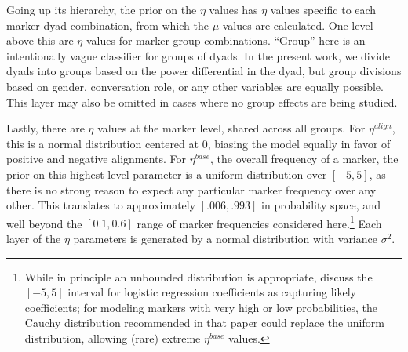 \documentclass{acm_proc_article-sp}
\begin{document}
Going up its hierarchy, the prior on the $\eta$ values has $\eta$ values specific to each marker-dyad combination, from which the $\mu$ values are calculated. One level above this are $\eta$ values for marker-group combinations. ``Group'' here is an intentionally vague classifier for groups of dyads.  In the present work, we divide dyads into groups based on the power differential in the dyad, but group divisions based on gender, conversation role, or any other variables are equally possible. This layer may also be omitted in cases where no group effects are being studied.

Lastly, there are $\eta$ values at the marker level, shared across all groups.  For $\eta^{align}$, this is a normal distribution centered at 0, biasing the model equally in favor of positive and negative alignments. For $\eta^{base}$, the overall frequency of a marker, the prior on this highest level parameter is a uniform distribution over $[-5,5]$, as there is no strong reason to expect any particular marker frequency over any other.  This translates to approximately $[.006,.993]$ in probability space, and well beyond the $[0.1,0.6]$ range of marker frequencies considered here.\footnote{While in principle an unbounded distribution is appropriate, \cite{GelmanEtAl2008} discuss the $[-5,5]$ interval for logistic regression coefficients as capturing likely coefficients; for modeling markers with very high or low probabilities, the Cauchy distribution recommended in that paper could replace the uniform distribution, allowing (rare) extreme $\eta^{base}$ values.}  Each layer of the $\eta$ parameters is generated by a normal distribution with variance $\sigma^2$.


\end{document}
